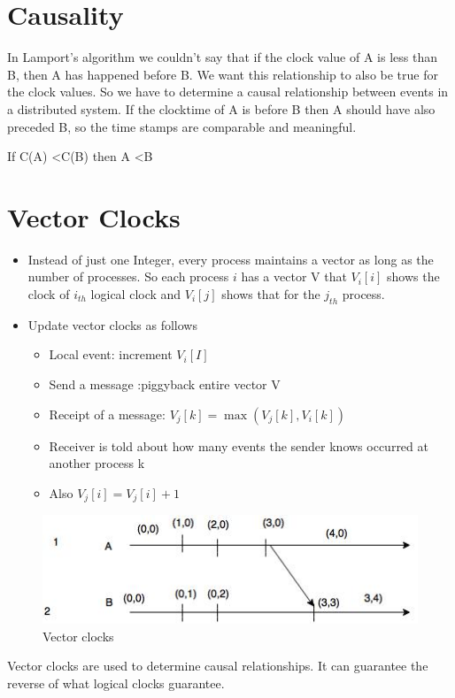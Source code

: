 \documentclass[twoside]{article}
\begin{document}
\section{Causality}
In Lamport's algorithm we couldn't say that if the clock value of A is less than B, then A has happened before B. We want this relationship to also be true for the clock values. So we have to determine a causal relationship between events in a distributed system. If the clocktime of A is before B then A should have also preceded B, so the time stamps are comparable and meaningful.

If C(A) \textless C(B) then A \textless B


\section{Vector Clocks}
\begin{itemize}
    
\item Instead of just one Integer, every process maintains a vector as long as the number of processes. So each process $i$ has a vector V that $V_i[i]$ shows the clock of $i_{th}$ logical clock and $V_i[j]$ shows that for the $j_{th}$ process.

\item Update vector clocks as follows
\begin{itemize}
    \item Local event: increment $V_i[I]$
    \item Send a message :piggyback entire vector V
    \item Receipt of a message: $V_j[k] = \max( V_j[k],V_i[k])$
    \item Receiver is told about how many events the sender knows occurred at another process k 
\item Also $V_j[i] = V_j[i]+1$
\end{itemize}


\end{itemize}

\begin{figure}[H]
    \centering
    \includegraphics{diagram4.jpg}
    \caption{Vector clocks}
    \label{fig:vector clocks}
\end{figure}
Vector clocks are used to determine causal relationships. It can guarantee the reverse of what logical clocks guarantee. 
\end{document}
